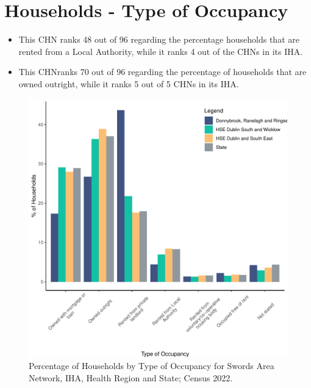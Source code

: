 \documentclass{article}
\begin{document}
\section{Households - Type of Occupancy}\label{sect:Households}
\begin{itemize}
\item This CHN ranks  48 out of 96 regarding the percentage households that are rented from a Local Authority, while it ranks  4 out of the CHNs in its IHA. 
\item This CHNranks  70 out of 96 regarding the percentage of households that are owned outright, while it ranks   5 out of 5 CHNs in its IHA.
\end{itemize}
\begin{figure}[H]
	\centering
	\includegraphics[width = 140mm]{../figures/HouseholdsED.pdf}
	\caption{Percentage of Households by Type of Occupancy for Swords Area Network, IHA, Health Region and State; Census 2022.}
	\label{fig:vbnv}
	\end{figure}
\end{document}
